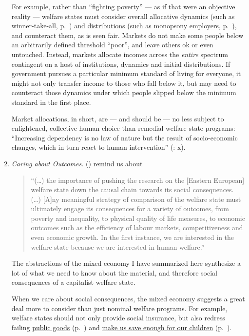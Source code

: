\begin{enumerate}
	For example, rather than ``fighting poverty'' --- as if that were an objective reality --- welfare states must consider overall allocative dynamics (such as \hyperref[sec:winner-take-all]{winner-take-all}, p.~\pageref{sec:winner-take-all}) and distributions (such as \hyperref[sec:monopsonyemployers]{monopsony employers}, p.~\pageref{sec:monopsonyemployers}), and counteract them, as is seen fair. Markets do not make some people below an arbitrarily defined threshold ``poor'', and leave others ok or even untouched. Instead, markets allocate incomes across the \emph{entire} spectrum contingent on a host of institutions, dynamics and initial distributions. If government pursues a particular minimum standard of living for everyone, it might not only transfer income to those who fall below it, but may need to counteract those dynamics under which people slipped below the minimum standard in the first place. 
	
	Market allocations, in short, are --- and should be --- no less subject to enlightened, collective human choice than remedial welfare state programs: ``Increasing dependency is no law of nature but the result of socio-economic changes, which in turn react to human intervention'' (\citealt{Esping-Andersen2002}: x).
	
	\item \emph{Caring about Outcomes.} \citeauthor{Haggard2009} (\citeyear[236]{Haggard2009}) remind us about
		\begin{quote}
			``(\ldots) the importance of pushing the research on the [Eastern European] welfare state down the causal chain towards its social consequences. (\ldots) [A]ny meaningful strategy of comparison of the welfare state must ultimately engage its consequences for a variety of outcomes, from poverty and inequality, to physical quality of life measures, to economic outcomes such as the efficiency of labour markets, competitiveness and even economic growth. In the first instance, we are interested in the welfare state because we are interested in human welfare.''
		\end{quote}
	
	The abstractions of the mixed economy I have summarized here synthesize a lot of what we need to know about the material, and therefore social consequences of a capitalist welfare state. 

	When we care about social consequences, the mixed economy suggests a great deal more to consider than just nominal welfare programs. For example, welfare states should not only provide social insurance, but also redress failing \hyperref[sec:public-good]{public goods} (p.~\pageref{sec:public-good}) and \hyperref[sec:long-terminconsistency]{make us save enough for our children} (p.~\pageref{sec:long-terminconsistency}). 
	

\end{enumerate}
